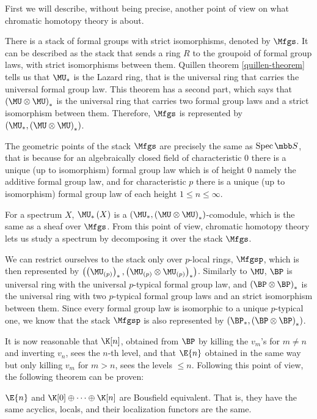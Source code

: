 First we will describe, without being precise, another point of view on what chromatic homotopy theory is about.

There is a stack of formal groups with strict isomorphisms, denoted by $\Mfgs$.
It can be described as the stack that sends a ring $R$ to the groupoid of formal group laws, with strict isomorphisms between them.
Quillen theorem \ref{quillen-theorem} tells us that $\MU_*$ is the Lazard ring, that is the universal ring that carries the universal formal group law.
This theorem has a second part, which says that $\left(\MU \otimes \MU\right)_*$ is the universal ring that carries two formal group laws and a strict isomorphism between them.
Therefore, $\Mfgs$ is represented by $\left(\MU_*, \left(\MU \otimes \MU\right)_*\right)$.

The geometric points of the stack $\Mfgs$ are precisely the same as $\spec \SS$, that is because for an algebraically closed field of characteristic $0$ there is a unique (up to isomorphism) formal group law which is of height $0$ namely the additive formal group law, and for characteristic $p$ there is a unique (up to isomorphism) formal group law of each height $1 \leq n \leq \infty$.

For a spectrum $X$, $\MU_*\left(X\right)$ is a $\left(\MU_*, \left(\MU \otimes \MU\right)_*\right)$-comodule, which is the same as a sheaf over $\Mfgs$.
From this point of view, chromatic homotopy theory lets us study a spectrum by decomposing it over the stack $\Mfgs$.

We can restrict ourselves to the stack only over $p$-local rings, $\Mfgsp$, which is then represented by $\left(\left(\MU_{\left(p\right)}\right)_*, \left(\MU_{\left(p\right)} \otimes \MU_{\left(p\right)}\right)_*\right)$.
Similarly to $\MU$, $\BP$ is universal ring with the universal $p$-typical formal group law, and $\left(\BP \otimes \BP\right)_*$ is the universal ring with two $p$-typical formal group laws and an strict isomorphism between them.
Since every formal group law is isomorphic to a unique $p$-typical one, we know that the stack $\Mfgsp$ is also represented by $\left(\BP_*, \left(\BP \otimes \BP\right)_*\right)$.

It is now reasonable that $\K[n]$, obtained from $\BP$ by killing the $v_m$'s for $m \neq n$ and inverting $v_n$, sees the $n$-th level, and that $\E{n}$ obtained in the same way but only killing $v_m$ for $m > n$, sees the levels $\leq n$.
Following this point of view, the following theorem can be proven:

\begin{theorem}
	$\E{n}$ and $\K[0] \oplus \cdots \oplus \K[n]$ are Bousfield equivalent.
	That is, they have the same acyclics, locals, and their localization functors are the same.
\end{theorem}

